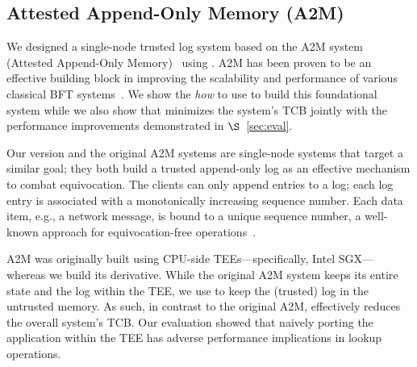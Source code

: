 

\subsection{Attested Append-Only Memory (A2M)}\label{sec:use_cases::a2m}
We designed a single-node trusted log system based on the A2M system (Attested Append-Only Memory)~\cite{A2M} using \projecttitle{}. A2M has been proven to be an effective building block in improving the scalability and performance of various classical BFT systems~\cite{sundr, Castro:2002, AbdElMalek2005FaultscalableBF}. We show the {\em how} to use \projecttitle{} to build this foundational system while we also show that \projecttitle{} minimizes the system's TCB jointly with the performance improvements demonstrated in $\S$~\ref{sec:eval}.

 Our \projecttitle{} version and the original A2M systems are single-node systems that target a similar goal; they both build a trusted append-only log as an effective mechanism to combat equivocation. The clients can only append entries to a log; each log entry is associated with a monotonically increasing sequence number. Each data item, e.g., a network message, is bound to a unique sequence number, a well-known approach for equivocation-free operations~\cite{clement2012, hybster}. 

A2M was originally built using CPU-side TEEs---specifically, Intel SGX--- whereas we build its \projecttitle{} derivative. While the original A2M system keeps its entire state and the log within the TEE, we use \projecttitle{} to keep the (trusted) log in the untrusted memory. As such, in contrast to the original A2M, \projecttitle{} effectively reduces the overall system's TCB. Our evaluation showed that naively porting the application within the TEE has adverse performance implications in lookup operations.



